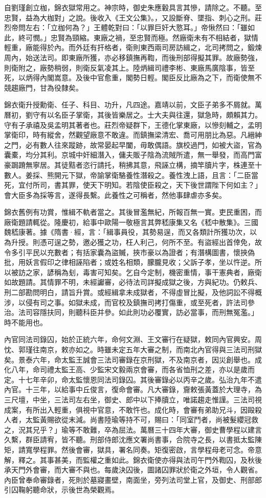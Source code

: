 自劉瑾創立枷，錦衣獄常用之。神宗時，御史朱應轂具言其慘，請除之。不聽。至忠賢，益為大枷對」之說。後收入《王文公集》。，又設斷脊、墜指、刺心之刑。莊烈帝問左右：「立枷何為？」王體乾對曰：「以罪巨奸大憝耳。」帝愀然曰：「雖如此，終可憫。」忠賢為頸縮。東廠之禍，至忠賢而極。然廠衛未有不相結者，獄情輕重，廠能得於內。而外廷有扞格者，衛則東西兩司房訪緝之，北司拷問之，鍛煉周內，始送法司。即東廠所獲，亦必移鎮撫再鞫，而後刑部得擬其罪。故廠勢強，則衛附之，廠勢稍弱，則衛反氣凌其上。陸炳緝司禮李彬、東廠馬廣陰事，皆至死，以炳得內閣嵩意。及後中官愈重，閣勢日輕。閣臣反比廠為之下，而衛使無不競趨廠門，甘為役隸矣。

錦衣衛升授勳衛、任子、科目、功升，凡四途。嘉靖以前，文臣子弟多不屑就。萬曆初，劉守有以名臣子掌衛，其後皆樂居之。士大夫與往還，獄急時，頗賴其力。守有子承禧及吳孟明其著者也。莊烈帝疑群下，王德化掌東廠，以慘刻輔之，孟明掌衛印，時有縱舍，然觀望廠意不敢違。而鎮撫梁清宏、喬可用朋比為惡。凡縉紳之門，必有數人往來蹤跡，故常晏起早闔，毋敢偶語。旗校過門，如被大盜，官為囊橐，均分其利。京城中奸細潛入，傭夫販子陰為流賊所遣，無一舉發，而高門富豪跼蹐無寧居。其徒黠者恣行請托，稍拂其意，飛誣立構，摘竿牘片字，株連至十數人。姜採、熊開元下獄，帝諭掌衛駱養性潛殺之。養性洩上語，且言：「二臣當死，宜付所司，書其罪，使天下明知。若陰使臣殺之，天下後世謂陛下何如主？」會大臣多為採等言，遂得長繫。此養性之可稱者，然他事肆虐亦多矣。

錦衣舊例有功賞，惟緝不軌者當之。其後冒濫無紀，所報百無一實。吏民重困，而廠衛題請輒從。隆慶初，給事中歐陽一敬極言其弊嵇康集又名《嵇中散集》。三國魏嵇康著。據《隋書·經，言：「緝事員役，其勢易逞，而又各類計所獲功次，以為升授。則憑可逞之勢，邀必獲之功，枉人利己，何所不至。有盜經出首倖免，故令多引平民以充數者；有括家囊為盜贓，挾市豪以為證者；有潛構圖書，懷挾偽批，用妖言假印之律相誣陷者；或姓名相類，朦朧見收；父訴子孝，坐以忤逆。所以被訪之家，諺稱為刬，毒害可知矣。乞自今定制，機密重情，事干憲典者，廠衛如故題請。其情罪不明，未經讞審，必待法司詳擬成獄之後，方與紀功。仍敕兵、刑二部勘問明白，請旨升賞。或經緝拿未成獄者，不得虛冒比擬，及他詞訟不得概涉，以侵有司之事。如獄未成，而官校及鎮撫司拷打傷重，或至死者，許法司參治。法司容隱扶同，則聽科臣并參。如此則功必覆實，訪必當事，而刑無冤濫。」時不能用也。

內官同法司錄囚，始於正統六年，命何文淵、王文審行在疑獄，敕同內官興安。周忱、郭瑾往南京，敕亦如之。時雖未定五年大審之制，而南北內官得與三法司刑獄矣。景泰六年，命太監王誠會三法司審錄在京刑獄，不及南京者，因災創舉也。成化八年，命司禮太監王高、少監宋文毅兩京會審，而各省恤刑之差，亦以是歲而定。十七年辛卯，命太監懷恩同法司錄囚。其後審錄必以丙辛之歲。弘治九年不遣內官。十三年，以給事中丘俊言，復命會審。凡大審錄，齎敕張黃蓋於大理寺，為三尺壇，中坐，三法司左右坐，御史、郎中以下捧牘立，唯諾趨走惟謹。三法司視成案，有所出入輕重，俱視中官意，不敢忤也。成化時，會審有弟助兄斗，因毆殺人者，太監黃賜欲從末減。尚書陸瑜等持不可，賜曰：「同室鬥者，尚被髮纓冠救之，況其兄乎？」瑜等不敢難，卒為屈法。萬曆三十四年大審，御史曹學程以建言久繫，群臣請宥，皆不聽。刑部侍郎沈應文署尚書事，合院寺之長，以書抵太監陳矩，請寬學程罪。然後會審，獄具，署名同奏。矩復密啟，言學程母老可念。帝意解，釋之。其事甚美，而監權之重如此。錦衣衛使亦得與法司午門外鞫囚，及秋後承天門外會審，而大審不與也。每歲決囚後，圖諸囚罪狀於衛之外垣，令人觀省。內臣曾奉命審錄者，死則於墓寢畫壁，南面坐，旁列法司堂上官，及御史、刑部郎引囚鞠躬聽命狀，示後世為榮觀焉。

